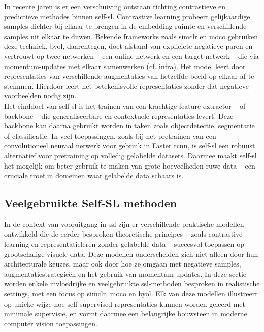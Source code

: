 In recente jaren is er een verschuiving ontstaan richting contrastieve en predictieve methodes binnen \gls{self-sl}. Contrastive learning probeert gelijkaardige samples dichter bij elkaar te brengen in de embedding-ruimte en verschillende samples uit elkaar te duwen. \autocite{Oord_2018} Bekende frameworks zoals \gls{simclr} en \gls{moco} gebruiken deze techniek. \gls{byol}, daarentegen, doet afstand van expliciete negatieve paren en vertrouwt op twee netwerken -- een online netwerk en een target netwerk -- die via momentum-updates met elkaar samenwerken (cf. infra). Het model leert door representaties van verschillende augmentaties van hetzelfde beeld op elkaar af te stemmen. Hierdoor leert het betekenisvolle representaties zonder dat negatieve voorbeelden nodig zijn. \\

Het einddoel van \gls{self-sl} is het trainen van een krachtige feature-extractor -- of backbone -- die generaliseerbare en contextuele representaties levert. Deze backbone kan daarna gebruikt worden in taken zoals objectdetectie, segmentatie of classificatie. In veel toepassingen, zoals bij het pretrainen van een convolutioneel neuraal netwerk voor gebruik in Faster \gls{rcnn}, is \gls{self-sl} een robuust alternatief voor pretraining op volledig gelabelde datasets. Daarmee maakt \gls{self-sl} het mogelijk om beter gebruik te maken van grote hoeveelheden ruwe data -- een cruciale troef in domeinen waar gelabelde data schaars is.

\subsection{Veelgebruikte Self-SL methoden}

In de context van vooruitgang in \gls{ssl} zijn er verschillende praktische modellen ontwikkeld die de eerder besproken theoretische principes -- zoals contrastive learning en representatieleren zonder gelabelde data -- succesvol toepassen op grootschalige visuele data. Deze modellen onderscheiden zich niet alleen door hun architecturale keuzes, maar ook door hoe ze omgaan met negatieve samples, augmentatiestrategieën en het gebruik van momentum-updates. In deze sectie worden enkele invloedrijke en veelgebruikte \gls{ssl}-methoden besproken in realistische settings, met een focus op \acrfull{simclr}, \acrfull{moco} en \acrfull{byol}. Elk van deze modellen illustreert op unieke wijze hoe self-supervised representaties kunnen worden geleerd met minimale supervisie, en vormt daarmee een belangrijke bouwsteen in moderne computer vision toepassingen.


